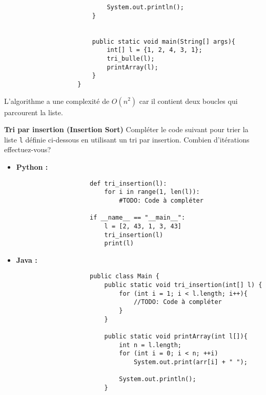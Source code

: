 \begin{Exercice} [10 minutes]
\begin{verbatim}
                            System.out.println(); 
                        } 
              
                        
                        public static void main(String[] args){
                            int[] l = {1, 2, 4, 3, 1};
                            tri_bulle(l);
                            printArray(l);
                        }
                    }
                \end{verbatim}
        
        L'algorithme a une complexité de $O(n^2)$ car il contient deux boucles qui parcourent la liste.
    
\end{Exercice}

\begin{Exercice} [10 minutes] \textbf{Tri par insertion (Insertion Sort)}
    Compléter le code suivant pour trier la liste \lstinline{l} définie ci-dessous en utilisant un tri par insertion. Combien d'itérations effectuez-vous?
    \begin{itemize}
        \item \textbf{Python :}
                \begin{verbatim}
                    def tri_insertion(l):
                        for i in range(1, len(l)):
                            #TODO: Code à compléter
                    
                    if __name__ == "__main__":
                        l = [2, 43, 1, 3, 43]
                        tri_insertion(l)
                        print(l)
                \end{verbatim}
        \item \textbf{Java :}
                \begin{verbatim}
                    public class Main {
                        public static void tri_insertion(int[] l) {
                            for (int i = 1; i < l.length; i++){
                                //TODO: Code à compléter 
                            }
                        }
                        
                        public static void printArray(int l[]){ 
                            int n = l.length; 
                            for (int i = 0; i < n; ++i) 
                                System.out.print(arr[i] + " "); 
                      
                            System.out.println(); 
                        } 
              

\end{verbatim}
\end{itemize}
\end{Exercice}
